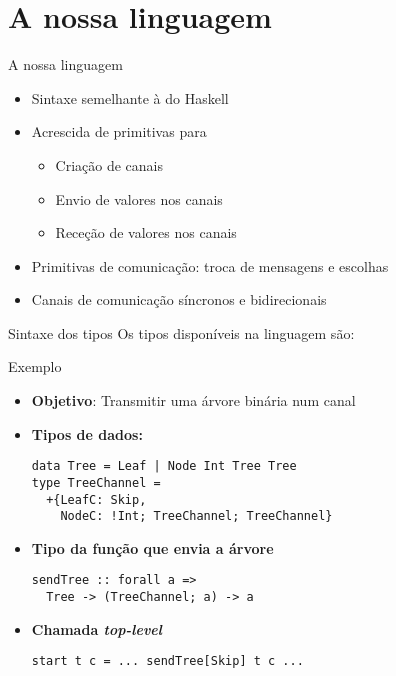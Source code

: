 \section{A nossa linguagem}

\begin{frame}[fragile]{A nossa linguagem}

  \begin{itemize}
  \item Sintaxe semelhante à do Haskell
  \item Acrescida de primitivas para
    \begin{itemize}
    \item Criação de canais
    \item Envio de valores nos canais
    \item Receção de valores nos canais
    \end{itemize}
 
  \item Primitivas de comunicação: troca de mensagens e escolhas
  \item Canais de comunicação síncronos e bidirecionais
  \end{itemize}  
\end{frame}

\begin{frame}[fragile]{Sintaxe dos tipos}
  Os tipos disponíveis na linguagem são:
    
\end{frame}

\lstset{language=CFST, style=eclipse, frame=none, numbers=none}
\begin{frame}[fragile]{Exemplo}
  \begin{itemize}
  \item \textbf{Objetivo}: Transmitir uma árvore binária num canal
  \item \textbf{Tipos de dados:}
\begin{lstlisting}
data Tree = Leaf | Node Int Tree Tree 
type TreeChannel =
  +{LeafC: Skip,
    NodeC: !Int; TreeChannel; TreeChannel}
\end{lstlisting}

  \item \textbf{Tipo da função que envia a árvore}
\begin{lstlisting}
sendTree :: forall a =>
  Tree -> (TreeChannel; a) -> a
\end{lstlisting}
 \item \textbf{Chamada \textit{top-level}}
\begin{lstlisting}
start t c = ... sendTree[Skip] t c ...
\end{lstlisting}

  \end{itemize}
\end{frame}

